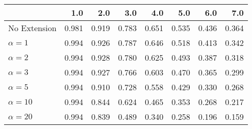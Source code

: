 \begin{tabular}{lrrrrrrr}
\toprule
{} &   1.0 &   2.0 &   3.0 &   4.0 &   5.0 &   6.0 &   7.0 \\
\midrule
No Extension  & 0.981 & 0.919 & 0.783 & 0.651 & 0.535 & 0.436 & 0.364 \\
$\alpha = 1$  & 0.994 & 0.926 & 0.787 & 0.646 & 0.518 & 0.413 & 0.342 \\
$\alpha = 2$  & 0.994 & 0.928 & 0.780 & 0.625 & 0.493 & 0.387 & 0.318 \\
$\alpha = 3$  & 0.994 & 0.927 & 0.766 & 0.603 & 0.470 & 0.365 & 0.299 \\
$\alpha = 5$  & 0.994 & 0.910 & 0.728 & 0.558 & 0.429 & 0.330 & 0.268 \\
$\alpha = 10$ & 0.994 & 0.844 & 0.624 & 0.465 & 0.353 & 0.268 & 0.217 \\
$\alpha = 20$ & 0.994 & 0.839 & 0.489 & 0.340 & 0.258 & 0.196 & 0.159 \\
\bottomrule
\end{tabular}
